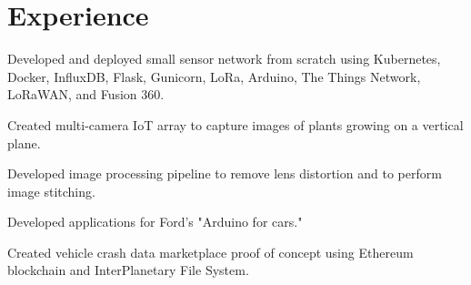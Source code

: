 \documentclass[]{deedy-resume-openfont}
\begin{document}
\begin{minipage}[t]{0.66\textwidth} 


\section{Experience}

\vspace{\topsep} %
\begin{tightemize}%

\item Developed and deployed small sensor network from scratch using   Kubernetes, Docker, InfluxDB, Flask, Gunicorn, LoRa, Arduino, The Things Network, LoRaWAN, and Fusion 360.

\end{tightemize}
\sectionsep

\begin{tightemize}
\item Created multi-camera IoT array to capture images of plants growing on a vertical plane.
\item Developed image processing pipeline to remove lens distortion and to perform image stitching.
\end{tightemize}
\sectionsep

\begin{tightemize}%

\item Developed applications for Ford's "Arduino for cars."
 
\item Created vehicle crash data marketplace proof of concept using Ethereum blockchain and InterPlanetary File System.

\end{tightemize}
\sectionsep

%




\end{minipage}
\end{document}
